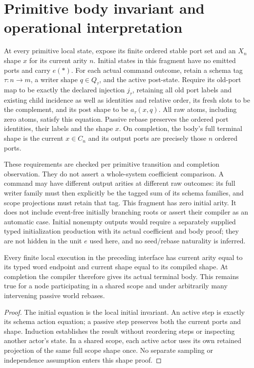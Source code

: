 \documentclass[11pt]{article}
\begin{document}
\section{Primitive body invariant and operational interpretation}
At every primitive local state, expose its finite ordered stable port set and an $X_n$ shape $x$ for its current arity $n$. Initial states in this fragment have no emitted ports and carry $e(*)$. For each actual command outcome, retain a schema tag $\tau:n\to m$, a writer shape $q\in Q_\tau$, and the active post-state. Require its old-port map to be exactly the declared injection $j_\tau$, retaining all old port labels and existing child incidence as well as identities and relative order, its fresh slots to be the complement, and its post shape to be $a_\tau(x,q)$. All raw atoms, including zero atoms, satisfy this equation. Passive rebase preserves the ordered port identities, their labels and the shape $x$. On completion, the body's full terminal shape is the current $x\in C_n$ and its output ports are precisely those $n$ ordered ports.

These requirements are checked per primitive transition and completion observation. They do not assert a whole-system coefficient comparison. A command may have different output arities at different raw outcomes: its full writer family must then explicitly be the tagged sum of its schema families, and scope projections must retain that tag. This fragment has zero initial arity. It does not include event-free initially branching roots or assert their compiler as an automatic case. Initial nonempty outputs would require a separately supplied typed initialization production with its actual coefficient and body proof; they are not hidden in the unit $e$ used here, and no seed/rebase naturality is inferred.

\begin{proposition}
Every finite local execution in the preceding interface has current arity equal to its typed word endpoint and current shape equal to its compiled shape. At completion the compiler therefore gives its actual terminal body. This remains true for a node participating in a shared scope and under arbitrarily many intervening passive world rebases.
\end{proposition}
\begin{proof}
The initial equation is the local initial invariant. An active step is exactly its schema action equation; a passive step preserves both the current ports and shape. Induction establishes the result without reordering steps or inspecting another actor's state. In a shared scope, each active actor uses its own retained projection of the same full scope shape once. No separate sampling or independence assumption enters this shape proof.
\end{proof}
\end{document}
